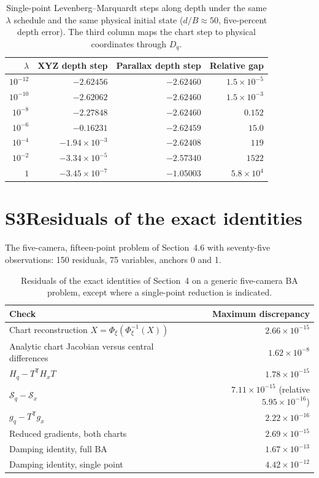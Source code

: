 \documentclass[11pt,a4paper]{article}
\newcommand{\T}{\mathsf{T}}
\begin{document}
\begin{table}[h]
\centering
\caption{Single-point Levenberg--Marquardt steps along depth under the same $\lambda$ schedule and the same physical initial state ($d/B\approx50$, five-percent depth error). The third column maps the chart step to physical coordinates through $D_q$.}
\label{tab:lm-steps}
\begin{tabular}{rrrr}
\toprule
$\lambda$ & XYZ depth step & Parallax depth step & Relative gap \\
\midrule
$10^{-12}$ & $-2.62456$ & $-2.62460$ & $1.5\times10^{-5}$\\
$10^{-10}$ & $-2.62062$ & $-2.62460$ & $1.5\times10^{-3}$\\
$10^{-8}$  & $-2.27848$ & $-2.62460$ & $0.152$\\
$10^{-6}$  & $-0.16231$ & $-2.62459$ & $15.0$\\
$10^{-4}$  & $-1.94\times10^{-3}$ & $-2.62408$ & $119$\\
$10^{-2}$  & $-3.34\times10^{-5}$ & $-2.57340$ & $1522$\\
$1$        & $-3.45\times10^{-7}$ & $-1.05003$ & $5.8\times10^{4}$\\
\bottomrule
\end{tabular}
\end{table}

\section*{S3\quad Residuals of the exact identities}

The five-camera, fifteen-point problem of Section~4.6 with seventy-five observations: 150 residuals, 75 variables, anchors 0 and 1.

\begin{table}[h]
\centering
\caption{Residuals of the exact identities of Section~4 on a generic five-camera BA problem, except where a single-point reduction is indicated.}
\label{tab:ba-checks}
\begin{tabular}{lr}
\toprule
Check & Maximum discrepancy \\
\midrule
Chart reconstruction $X=\Phi_\xi(\Phi_\xi^{-1}(X))$ & $2.66\times10^{-15}$ \\
Analytic chart Jacobian versus central differences & $1.62\times10^{-8}$ \\
$H_q-T^{\T}H_xT$ & $1.78\times10^{-15}$ \\
$\mathcal S_q-\mathcal S_x$ & $7.11\times10^{-15}$ (relative $5.95\times10^{-16}$) \\
$g_q-T^{\T}g_x$ & $2.22\times10^{-16}$ \\
Reduced gradients, both charts & $2.69\times10^{-15}$ \\
Damping identity, full BA & $1.67\times10^{-13}$ \\
Damping identity, single point & $4.42\times10^{-12}$ \\
\bottomrule
\end{tabular}
\end{table}
\end{document}
